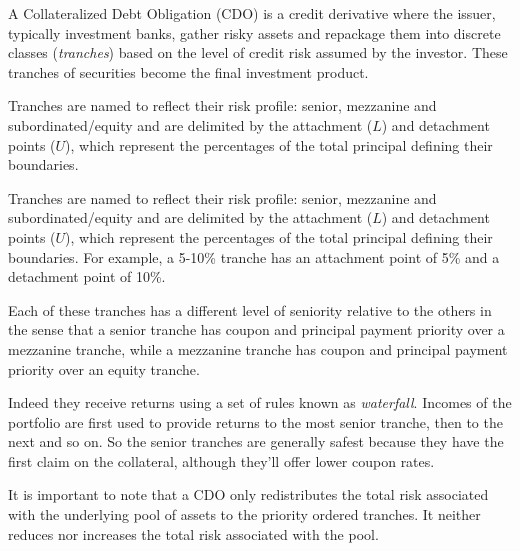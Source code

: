 A Collateralized Debt Obligation (CDO) is a credit derivative where the issuer, typically investment banks, gather risky assets and repackage them into discrete classes (\emph{tranches}) based on the level of credit risk assumed by the investor. These tranches of securities become the final investment product.

Tranches are named to reflect their risk profile: senior, mezzanine and subordinated/equity and are delimited by the attachment ($L$) and detachment points ($U$), which represent the percentages of the total principal defining their boundaries. 

Tranches are named to reflect their risk profile: senior, mezzanine and subordinated/equity and are delimited by the attachment ($L$) and detachment points ($U$), which represent the percentages of the total principal defining their boundaries. 
For example, a 5-10\% tranche has an attachment point of 5\% and a detachment point of 10\%. 

Each of these tranches has a different level of seniority relative to the others in the sense that a senior tranche has coupon
and principal payment priority over a mezzanine tranche, while a mezzanine tranche has
coupon and principal payment priority over an equity tranche. 

Indeed they receive returns using a set of rules known as \emph{waterfall}. Incomes of the portfolio are first used to provide returns to the most senior tranche, then to the next and so on.
So the senior tranches are generally safest because they have the first claim on the collateral, although they'll offer lower coupon rates.

It is important to note
that a CDO only redistributes the total risk associated with the underlying pool of assets
to the priority ordered tranches. It neither reduces nor increases the total risk associated
with the pool.

